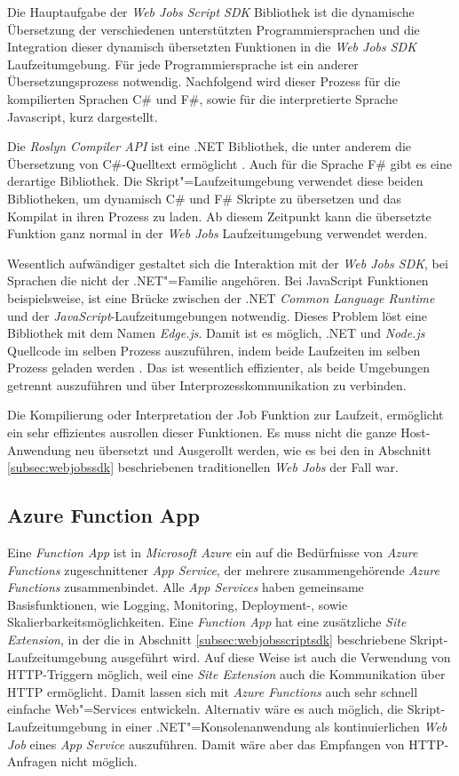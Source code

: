 Die Hauptaufgabe der \textit{Web Jobs Script SDK} Bibliothek ist die dynamische Übersetzung der verschiedenen unterstützten Programmiersprachen und die Integration dieser dynamisch übersetzten Funktionen in die \textit{Web Jobs SDK} Laufzeitumgebung. Für jede Programmiersprache ist ein anderer Übersetzungsprozess notwendig. Nachfolgend wird dieser Prozess für die kompilierten Sprachen C\# und F\#, sowie für die interpretierte Sprache Javascript, kurz dargestellt.

Die \textit{Roslyn Compiler API} ist eine .NET Bibliothek, die unter anderem die Übersetzung von C\#-Quelltext ermöglicht \cite[5]{Roslyn}. Auch für die Sprache F\# gibt es eine derartige Bibliothek. Die Skript"=Laufzeitumgebung verwendet diese beiden Bibliotheken, um dynamisch C\# und F\# Skripte zu übersetzen und das Kompilat in ihren Prozess zu laden. Ab diesem Zeitpunkt kann die übersetzte Funktion ganz normal in der \textit{Web Jobs} Laufzeitumgebung verwendet werden.

Wesentlich aufwändiger gestaltet sich die Interaktion mit der \textit{Web Jobs SDK}, bei Sprachen die nicht der .NET"=Familie angehören. Bei JavaScript Funktionen beispielsweise, ist eine Brücke zwischen der .NET \textit{Common Language Runtime} und der \textit{JavaScript}-Laufzeitumgebungen notwendig. Dieses Problem löst eine Bibliothek mit dem Namen \textit{Edge.js}. Damit ist es möglich, .NET und \textit{Node.js} Quellcode im selben Prozess auszuführen, indem beide Laufzeiten im selben Prozess geladen werden \cite{EdgeJs}. Das ist wesentlich effizienter, als beide Umgebungen getrennt auszuführen und über Interprozesskommunikation zu verbinden.

Die Kompilierung oder Interpretation der Job Funktion zur Laufzeit, ermöglicht ein sehr effizientes ausrollen dieser Funktionen. Es muss nicht die ganze Host-Anwendung neu übersetzt und Ausgerollt werden, wie es bei den in Abschnitt \ref{subsec:webjobssdk} beschriebenen traditionellen \textit{Web Jobs} der Fall war.

\subsection{Azure Function App}

Eine \textit{Function App} ist in \textit{Microsoft Azure} ein auf die Bedürfnisse von \textit{Azure Functions} zugeschnittener \textit{App Service}, der mehrere zusammengehörende \textit{Azure Functions} zusammenbindet. Alle \textit{App Services} haben gemeinsame Basisfunktionen, wie \zB Logging, Monitoring, Deployment-, sowie Skalierbarkeitsmöglichkeiten. Eine \textit{Function App} hat eine zusätzliche \textit{Site Extension}, in der die in Abschnitt \ref{subsec:webjobsscriptsdk} beschriebene Skript-Laufzeitumgebung ausgeführt wird. Auf diese Weise ist auch die Verwendung von HTTP-Triggern möglich, weil eine \textit{Site Extension} auch die Kommunikation über HTTP ermöglicht. Damit lassen sich mit \textit{Azure Functions} auch sehr schnell einfache Web"=Services entwickeln. Alternativ wäre es auch möglich, die Skript-Laufzeitumgebung in einer .NET"=Konsolenanwendung als kontinuierlichen \textit{Web Job} eines \textit{App Service} auszuführen. Damit wäre aber das Empfangen von HTTP-Anfragen nicht möglich.

